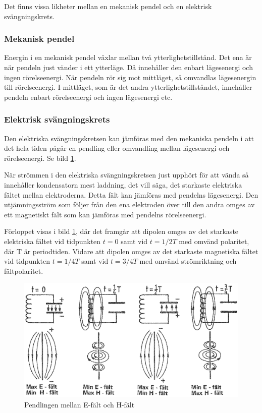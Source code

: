 Det finns vissa likheter mellan en mekanisk pendel och en elektrisk
svängningskrets.

\subsubsection{Mekanisk pendel}

Energin i en mekanisk pendel växlar mellan två ytterlighetstillstånd.
Det ena är när pendeln just vänder i ett ytterläge.
Då innehåller den enbart lägesenergi och ingen rörelseenergi.
När pendeln rör sig mot mittläget, så omvandlas lägesenergin till rörelseenergi.
I mittläget, som är det andra ytterlighetstillståndet, innehåller pendeln enbart
rörelseenergi och ingen lägesenergi etc.

\subsubsection{Elektrisk svängningskrets}

Den elektriska svängningskretsen kan jämföras med den mekaniska
pendeln i att det hela tiden pågår en pendling eller omvandling mellan
lägesenergi och rörelseenergi. Se bild \ref{fig:BildII7-02}.

När strömmen i den elektriska svängningskretsen just upphört för att
vända så innehåller kondensatorn mest laddning, det vill säga, det
starkaste elektriska fältet mellan elektroderna.
Detta fält kan jämföras med pendelns lägesenergi.
Den utjämningsström som följer från den ena elektroden över till den
andra omges av ett magnetiskt fält som kan jämföras med pendelns
rörelseenergi.

Förloppet visas i bild \ref{fig:BildII7-02}, där det framgår att dipolen omges
av det starkaste elektriska fältet vid tidpunkten \(t=0\) samt vid
\(t=1/2T\) med omvänd polaritet, där T är periodtiden.
Vidare att dipolen omges av det starkaste magnetiska fältet vid tidpunkten
\(t=1/4T\) samt vid \(t=3/4T\) med omvänd strömriktning och fältpolaritet.

\begin{figure}
\includegraphics[width=\textwidth]{images/cropped_pdfs/bild_2_7-02.pdf}
\caption{Pendlingen mellan E-fält och H-fält}
\label{fig:BildII7-02}
\end{figure}

